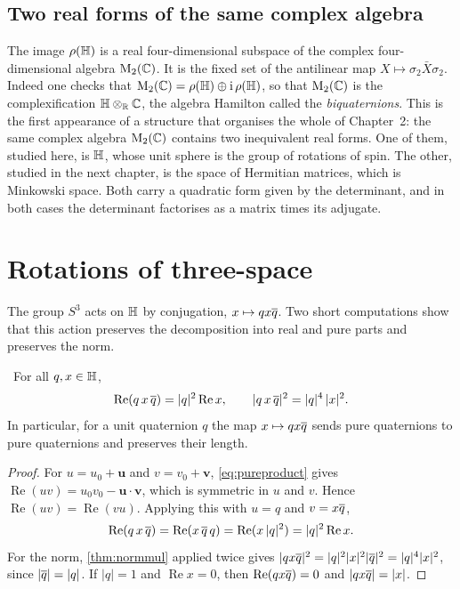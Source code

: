 \subsection*{Two real forms of the same complex algebra}

The image $\rho(\mathbb{H})$ is a real four-dimensional subspace of the complex four-dimensional algebra $\mathrm{M}_2(\mathbb{C})$. It is the fixed set of the antilinear map $X\mapsto\sigma_2\bar X\sigma_2$. Indeed one checks that $\mathrm{M}_2(\mathbb{C})=\rho(\mathbb{H})\oplus\mathrm{i}\,\rho(\mathbb{H})$, so that $\mathrm{M}_2(\mathbb{C})$ is the complexification $\mathbb{H}\otimes_{\mathbb{R}}\mathbb{C}$, the algebra Hamilton called the \emph{biquaternions}. This is the first appearance of a structure that organises the whole of Chapter~2: the same complex algebra $\mathrm{M}_2(\mathbb{C})$ contains two inequivalent real forms. One of them, studied here, is $\mathbb{H}$, whose unit sphere is the group of rotations of spin. The other, studied in the next chapter, is the space of Hermitian matrices, which is Minkowski space. Both carry a quadratic form given by the determinant, and in both cases the determinant factorises as a matrix times its adjugate.

\section{Rotations of three-space}

The group $S^3$ acts on $\mathbb{H}$ by conjugation, $x\mapsto qx\overline{q}$. Two short computations show that this action preserves the decomposition into real and pure parts and preserves the norm.

\begin{theorem}\label{thm:conj}\ver\
For all $q,x\in\mathbb{H}$,
\[
\operatorname{Re}(q\,x\,\overline{q})=|q|^2\operatorname{Re}x,\qquad |q\,x\,\overline{q}|^2=|q|^4\,|x|^2 .
\]
In particular, for a unit quaternion $q$ the map $x\mapsto qx\overline{q}$ sends pure quaternions to pure quaternions and preserves their length.
\end{theorem}
\begin{proof}
For $u=u_0+\mathbf u$ and $v=v_0+\mathbf v$, \eqref{eq:pureproduct} gives $\operatorname{Re}(uv)=u_0v_0-\mathbf u\cdot\mathbf v$, which is symmetric in $u$ and $v$. Hence $\operatorname{Re}(uv)=\operatorname{Re}(vu)$. Applying this with $u=q$ and $v=x\overline{q}$,
\[
\operatorname{Re}(q\,x\,\overline{q})=\operatorname{Re}(x\,\overline{q}\,q)=\operatorname{Re}(x\,|q|^2)=|q|^2\operatorname{Re}x .
\]
For the norm, \cref{thm:normmul} applied twice gives $|qx\overline{q}|^2=|q|^2|x|^2|\overline{q}|^2=|q|^4|x|^2$, since $|\overline{q}|=|q|$. If $|q|=1$ and $\operatorname{Re}x=0$, then $\operatorname{Re}(qx\overline{q})=0$ and $|qx\overline{q}|=|x|$.
\end{proof}


